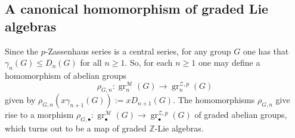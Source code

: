 \documentclass{amsart}
\theoremstyle{plain}
\theoremstyle{definition}
\numberwithin{theorem}{section}
\numberwithin{equation}{section}
\newcommand{\grM}{\operatorname{gr}^{\mathscr M}}
\newcommand{\grZ}{\operatorname{gr}^{{\mathcal Z}, p}}
\newcommand{\Z}{\mathbb Z}
\begin{document}
\subsection{A canonical homomorphism of graded Lie algebras}
Since the $p$-Zassenhaus series is a central series, for any group $G$ one has that $\gamma_n(G) \leq D_n(G)$ for all $n \geq 1$. So, for each $n \geq 1$ one may define a homomorphism of abelian groups 
\begin{equation}
    \rho_{G, n} : \grM_n(G) \to \grZ_n(G)
\end{equation}
given by $\rho_{G, n}(x\gamma_{n+1}(G)) := xD_{n+1}(G)$. The homomorphisms $\rho_{G, n}$ give rise to a morphism $\rho_{G, \bullet} : \grM_\bullet(G) \to \grZ_\bullet(G)$ of graded abelian groups, which turns out to be a map of graded $\Z$-Lie algebras. 
\end{document}

